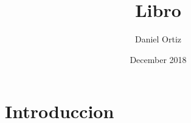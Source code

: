 \documentclass{book}
\title{Libro}
\author{Daniel Ortiz}
\date{December 2018}
\begin{document}
\maketitle
\chapter{Introduccion}
\end{document}
